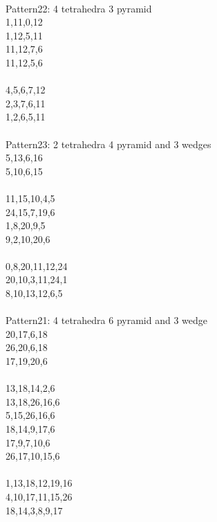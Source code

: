 \documentclass[twocolumn]{article}
\begin{document}
 \\
\tiny  Pattern22: 4 tetrahedra 3 pyramid \\
\tiny  1,11,0,12 \\
\tiny  1,12,5,11 \\
\tiny  11,12,7,6 \\
\tiny  11,12,5,6 \\
\tiny   \\
\tiny  4,5,6,7,12 \\
\tiny  2,3,7,6,11 \\
\tiny  1,2,6,5,11 \\

 \\
\tiny  Pattern23: 2 tetrahedra 4 pyramid and 3 wedges\\
\tiny  5,13,6,16 \\
\tiny  5,10,6,15 \\
\tiny   \\
\tiny  11,15,10,4,5 \\
\tiny  24,15,7,19,6 \\
\tiny  1,8,20,9,5 \\
\tiny  9,2,10,20,6 \\
\tiny   \\
\tiny  0,8,20,11,12,24 \\
\tiny  20,10,3,11,24,1 \\
\tiny  8,10,13,12,6,5 \\

 \\
\tiny  Pattern21: 4 tetrahedra 6 pyramid and 3 wedge\\
\tiny  20,17,6,18 \\
\tiny  26,20,6,18 \\
\tiny  17,19,20,6 \\
\tiny   \\
\tiny  13,18,14,2,6 \\
\tiny  13,18,26,16,6 \\
\tiny  5,15,26,16,6 \\
\tiny  18,14,9,17,6 \\
\tiny  17,9,7,10,6 \\
\tiny  26,17,10,15,6 \\
\tiny   \\
\tiny  1,13,18,12,19,16 \\
\tiny  4,10,17,11,15,26 \\
\tiny  18,14,3,8,9,17 \\
\tiny   \\
\tiny   \\
\end{document}
